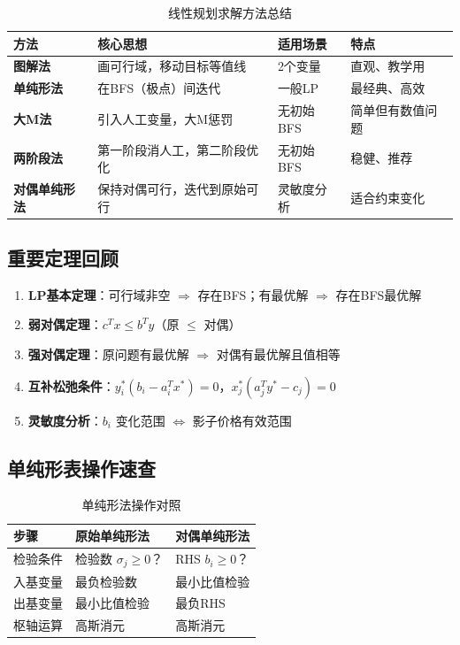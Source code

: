 \begin{table}[H]
\centering
\caption{线性规划求解方法总结}
\begin{tabular}{@{}p{3cm}p{4cm}p{3cm}p{3cm}@{}}
\toprule
\textbf{方法} & \textbf{核心思想} & \textbf{适用场景} & \textbf{特点} \\
\midrule
\textbf{图解法} & 画可行域，移动目标等值线 & 2个变量 & 直观、教学用 \\
\midrule
\textbf{单纯形法} & 在BFS（极点）间迭代 & 一般LP & 最经典、高效 \\
\midrule
\textbf{大M法} & 引入人工变量，大M惩罚 & 无初始BFS & 简单但有数值问题 \\
\midrule
\textbf{两阶段法} & 第一阶段消人工，第二阶段优化 & 无初始BFS & 稳健、推荐 \\
\midrule
\textbf{对偶单纯形法} & 保持对偶可行，迭代到原始可行 & 灵敏度分析 & 适合约束变化 \\
\bottomrule
\end{tabular}
\end{table}

\subsection{重要定理回顾}

\begin{enumerate}
    \item \textbf{LP基本定理}：可行域非空 $\Rightarrow$ 存在BFS；有最优解 $\Rightarrow$ 存在BFS最优解
    
    \item \textbf{弱对偶定理}：$c^T x \leq b^T y$（原 $\leq$ 对偶）
    
    \item \textbf{强对偶定理}：原问题有最优解 $\Rightarrow$ 对偶有最优解且值相等
    
    \item \textbf{互补松弛条件}：$y_i^*(b_i - a_i^T x^*) = 0$，$x_j^*(a_j^T y^* - c_j) = 0$
    
    \item \textbf{灵敏度分析}：$b_i$ 变化范围 $\Leftrightarrow$ 影子价格有效范围
\end{enumerate}

\subsection{单纯形表操作速查}

\begin{table}[H]
\centering
\caption{单纯形法操作对照}
\begin{tabular}{@{}lll@{}}
\toprule
\textbf{步骤} & \textbf{原始单纯形法} & \textbf{对偶单纯形法} \\
\midrule
检验条件 & 检验数 $\sigma_j \geq 0$？ & RHS $b_i \geq 0$？ \\
入基变量 & 最负检验数 & 最小比值检验 \\
出基变量 & 最小比值检验 & 最负RHS \\
枢轴运算 & 高斯消元 & 高斯消元 \\
\bottomrule
\end{tabular}
\end{table}


